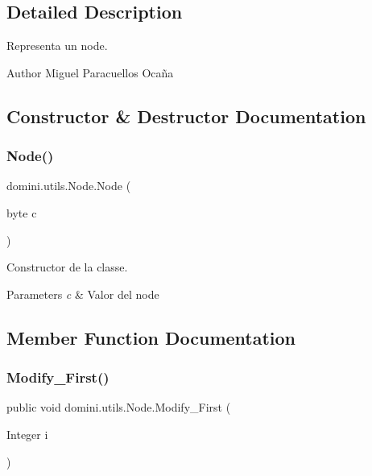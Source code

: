 \subsection{Detailed Description}
Representa un node. 

\begin{DoxyAuthor}{Author}
Miguel Paracuellos Ocaña 
\end{DoxyAuthor}


\subsection{Constructor \& Destructor Documentation}
\mbox{\label{classdomini_1_1utils_1_1Node_ae337ba617322158f0ac240c900350278}} 
\subsubsection{\texorpdfstring{Node()}{Node()}}
{\footnotesize\ttfamily domini.\+utils.\+Node.\+Node (\begin{DoxyParamCaption}\item[{byte}]{c }\end{DoxyParamCaption})\hspace{0.3cm}{\ttfamily [inline]}}



Constructor de la classe. 


\begin{DoxyParams}{Parameters}
{\em c} & Valor del node \\
\hline
\end{DoxyParams}


\subsection{Member Function Documentation}
\mbox{\label{classdomini_1_1utils_1_1Node_a3fe2e958308c90d24607a4e191680089}} 
\subsubsection{\texorpdfstring{Modify\+\_\+\+First()}{Modify\_First()}}
{\footnotesize\ttfamily public void domini.\+utils.\+Node.\+Modify\+\_\+\+First (\begin{DoxyParamCaption}\item[{Integer}]{i }\end{DoxyParamCaption})\hspace{0.3cm}{\ttfamily [inline]}}



